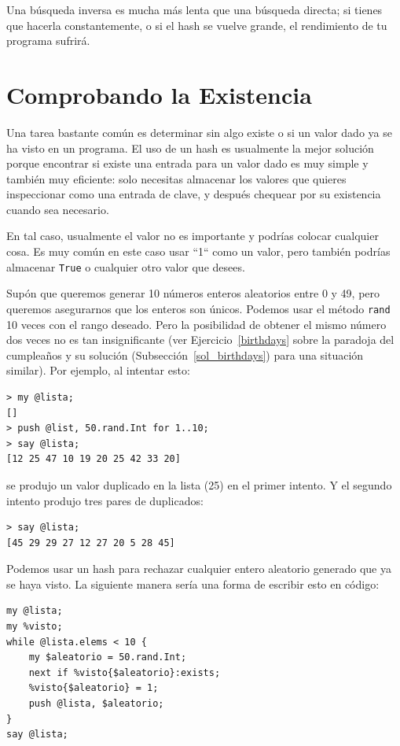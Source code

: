 Una búsqueda inversa es mucha más lenta que una búsqueda directa;
si tienes que hacerla constantemente, o si el hash se vuelve grande,
el rendimiento de tu programa sufrirá.

\section{Comprobando la Existencia}

Una tarea bastante común es determinar sin algo existe o si un valor
dado ya se ha visto en un programa. El uso de un hash es usualmente
la mejor solución porque encontrar si existe una entrada para un valor
dado es muy simple y también muy eficiente: solo necesitas almacenar los
valores que quieres inspeccionar como una entrada de clave, y después 
chequear por su existencia cuando sea necesario.

En tal caso, usualmente el valor no es importante y podrías
colocar cualquier cosa. Es muy común en este caso usar ``1`` como
un valor, pero también podrías almacenar {\tt True} o cualquier
otro valor que desees.

Supón que queremos generar 10 números enteros aleatorios entre 0
y 49, pero queremos asegurarnos que los enteros son únicos. Podemos
usar el método {\tt rand} 10 veces con el rango deseado. Pero la
posibilidad de obtener el mismo número dos veces no es tan
insignificante (ver Ejercicio~\ref{birthdays} sobre la 
paradoja del cumpleaños y su solución (Subsección~\ref{sol_birthdays}) 
para una situación similar). Por ejemplo, al intentar esto:

\begin{lstlisting}
> my @lista;
[]
> push @list, 50.rand.Int for 1..10;
> say @lista;
[12 25 47 10 19 20 25 42 33 20]
\end{lstlisting}

se produjo un valor duplicado en la lista (25) en el primer intento.
Y el segundo intento produjo tres pares de duplicados:

\begin{lstlisting}
> say @lista;
[45 29 29 27 12 27 20 5 28 45]
\end{lstlisting}

Podemos usar un hash para rechazar cualquier entero aleatorio
generado que ya se haya visto. La siguiente manera sería una forma
de escribir esto en código:

\begin{lstlisting}
my @lista;
my %visto;
while @lista.elems < 10 {
    my $aleatorio = 50.rand.Int;
    next if %visto{$aleatorio}:exists;
    %visto{$aleatorio} = 1;
    push @lista, $aleatorio;
}
say @lista;
\end{lstlisting}

